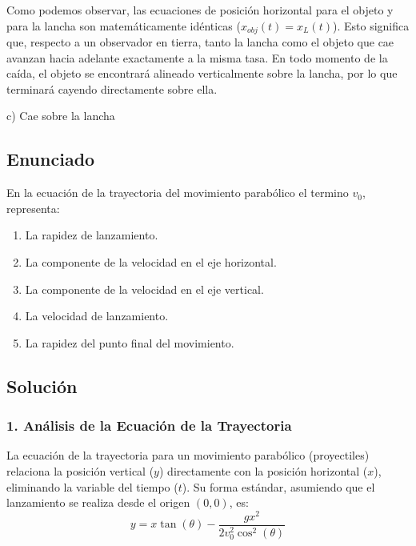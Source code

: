 \documentclass[12pt, a4paper]{article}
\begin{document}
Como podemos observar, las ecuaciones de posición horizontal para el objeto y para la lancha son matemáticamente idénticas ($x_{obj}(t) = x_{L}(t)$). Esto significa que, respecto a un observador en tierra, tanto la lancha como el objeto que cae avanzan hacia adelante exactamente a la misma tasa. En todo momento de la caída, el objeto se encontrará alineado verticalmente sobre la lancha, por lo que terminará cayendo directamente sobre ella.

\begin{tcolorbox}[colback=green!5!white, colframe=green!50!black, title=Respuesta Final]
\centering \Large c) Cae sobre la lancha
\end{tcolorbox}

\newpage

\subsection*{Enunciado}
En la ecuación de la trayectoria del movimiento parabólico el termino $v_0$, representa:

\begin{enumerate}[label=\alph*)]
    \item La rapidez de lanzamiento.
    \item La componente de la velocidad en el eje horizontal.
    \item La componente de la velocidad en el eje vertical.
    \item La velocidad de lanzamiento.
    \item La rapidez del punto final del movimiento.
\end{enumerate}

\subsection*{Solución}

\subsubsection*{1. Análisis de la Ecuación de la Trayectoria}
La ecuación de la trayectoria para un movimiento parabólico (proyectiles) relaciona la posición vertical ($y$) directamente con la posición horizontal ($x$), eliminando la variable del tiempo ($t$). Su forma estándar, asumiendo que el lanzamiento se realiza desde el origen $(0,0)$, es:
$$ y = x \tan(\theta) - \frac{g x^2}{2 v_0^2 \cos^2(\theta)} $$
\end{document}
